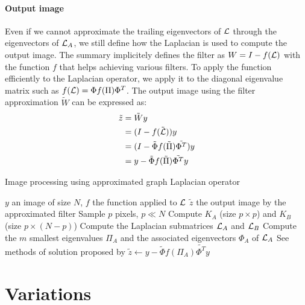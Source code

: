 \paragraph{Output image}
Even if we cannot approximate the trailing eigenvectors of \(\operatorname{\mathcal{L}}\) through the eigenvectors of \(\operatorname{\mathcal{L}}_A\), we still define how the Laplacian is used to compute the output image.
The summary \cite{modern_tour_2013} implicitely defines the filter as \(W = I - f(\operatorname{\mathcal{L}})\) with the function \(f\) that helps achieving various filters.
To apply the function efficiently to the Laplacian operator, we apply it to the diagonal eigenvalue matrix such as \(f(\operatorname{\mathcal{L}}) = \Phi f(\Pi) \Phi^T\).
The output image using the filter approximation \(\tilde{W}\) can be expressed as:
\begin{equation}
 \begin{split}
     \tilde{z} & = \tilde{W}y \\
               & = (I - f(\tilde{\operatorname{\mathcal{L}}})) y \\
               & = (I - \tilde{\Phi} f(\tilde{\Pi}) \tilde{\Phi^T}) y \\
               & = y - \tilde{\Phi} f(\tilde{\Pi}) \tilde{\Phi^T} y
 \end{split}
\end{equation}

\begin{algorithm}[H]
 \caption{Image processing using approximated graph Laplacian operator}
 \begin{algorithmic}
  \REQUIRE \(y\) an image of size \(N\), \(f\) the function applied to \(\operatorname{\mathcal{L}}\)
  \ENSURE \(\tilde{z}\) the output image by the approximated filter
  \STATE {}
  \STATE Sample \(p\) pixels, \(p \ll N\)
  \STATE {}
  \STATE Compute \(K_A\) (size \(p \times p\)) and \(K_B\) (size \(p \times (N-p)\))
  \STATE Compute the Laplacian submatrices \(\operatorname{\mathcal{L}}_A\) and \(\operatorname{\mathcal{L}}_B\)
  \STATE {}
  \STATE Compute the \(m\) smallest eigenvalues \(\Pi_A\) and the associated eigenvectors \(\Phi_A\) of \(\operatorname{\mathcal{L}}_A\)
  \STATE {}
  \STATE See methods of solution proposed by \cite{fowlkes_spectral_2004}
  \STATE \(\tilde{z} \leftarrow y - \tilde{\Phi} f(\Pi_A) \tilde{\Phi^T} y\)
 \end{algorithmic}
\end{algorithm}

\section{Variations}

